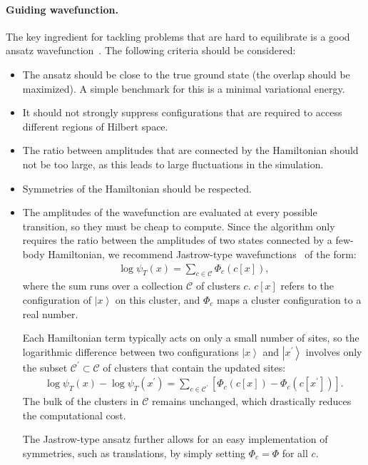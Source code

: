 \documentclass{SciPost}
\providecommand{\ket}[1]{\left|#1\right\rangle}
\begin{document}
\paragraph{Guiding wavefunction.}
The key ingredient for tackling problems that are hard to equilibrate is a good ansatz wavefunction~\cite{pilati_self-learning_2019,qin_combination_2020,lin_greens_2022,lin_greens_2024}.
%
The following criteria should be considered:
\begin{itemize}
	\item The ansatz should be close to the true ground state (the overlap should be maximized).
	A simple benchmark for this is a minimal variational energy.
	\item It should not strongly suppress configurations that are required to access different regions of Hilbert space.
	\item The ratio between amplitudes that are connected by the Hamiltonian should not be too large, as this leads to large fluctuations in the simulation.
	\item Symmetries of the Hamiltonian should be respected.
	\item The amplitudes of the wavefunction are evaluated at every possible transition, so they must be cheap to compute.
		Since the algorithm only requires the ratio between the amplitudes of two states connected by a few-body Hamiltonian, we recommend Jastrow-type wavefunctions~\cite{jastrow_many-body_1955,changlani_approximating_2009,mezzacapo_ground-state_2009} of the form:
		\begin{align}
			\log \psi_T(x) =  \sum_{c\in\mathcal{C}} \Phi_c(c[x]),\label{eq:cluster_guide}
		\end{align}
		where the sum runs over a collection $\mathcal{C}$ of clusters $c$.
		$c[x]$ refers to the configuration of $\ket{x}$ on this cluster, and $\Phi_c$ maps a cluster configuration to a real number.

Each Hamiltonian term typically acts on only a small number of sites, so the logarithmic difference between two configurations $\ket{x}$ and $\ket{x^\prime}$ involves only the subset $\mathcal{C}^\prime \subset \mathcal{C}$ of clusters that contain the updated sites:
		\begin{align}
			\log \psi_T(x) - \log \psi_T(x^\prime) =  \sum_{c\in\mathcal{C}^\prime} \left[ \Phi_c(c[x]) - \Phi_c(c[x^\prime]) \right].
		\end{align}
		The bulk of the clusters in $\mathcal{C}$ remains unchanged, which drastically reduces the computational cost.

		The Jastrow-type ansatz further allows for an easy implementation of symmetries, such as translations, by simply setting $\Phi_c=\Phi$ for all $c$.
\end{itemize}
\end{document}
